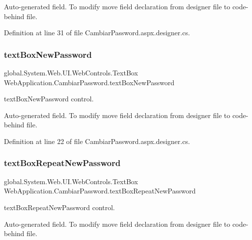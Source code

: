 Auto-\/generated field. To modify move field declaration from designer file to code-\/behind file. 

Definition at line 31 of file Cambiar\+Password.\+aspx.\+designer.\+cs.

\mbox{\label{classWebApplication_1_1CambiarPassword_af57b154b17144a229bb1a89b02945d04}} 
\subsubsection{\texorpdfstring{textBoxNewPassword}{textBoxNewPassword}}
{\footnotesize\ttfamily global.\+System.\+Web.\+U\+I.\+Web\+Controls.\+Text\+Box Web\+Application.\+Cambiar\+Password.\+text\+Box\+New\+Password\hspace{0.3cm}{\ttfamily [protected]}}



text\+Box\+New\+Password control. 

Auto-\/generated field. To modify move field declaration from designer file to code-\/behind file. 

Definition at line 22 of file Cambiar\+Password.\+aspx.\+designer.\+cs.

\mbox{\label{classWebApplication_1_1CambiarPassword_a4db4322109a3840647ddabf2a508c42e}} 
\subsubsection{\texorpdfstring{textBoxRepeatNewPassword}{textBoxRepeatNewPassword}}
{\footnotesize\ttfamily global.\+System.\+Web.\+U\+I.\+Web\+Controls.\+Text\+Box Web\+Application.\+Cambiar\+Password.\+text\+Box\+Repeat\+New\+Password\hspace{0.3cm}{\ttfamily [protected]}}



text\+Box\+Repeat\+New\+Password control. 

Auto-\/generated field. To modify move field declaration from designer file to code-\/behind file. 


